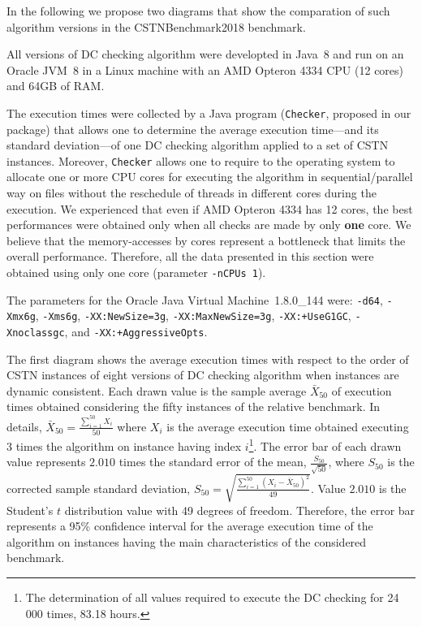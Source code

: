 \documentclass[a4paper,11pt]{article}
\begin{document}
In the following we propose two diagrams that show the comparation of such algorithm versions in the CSTNBenchmark2018 benchmark.

All versions of DC checking algorithm were developted in Java~8 and run on an Oracle JVM~8 in a Linux machine with an AMD Opteron 4334
CPU (12 cores) and 64GB of RAM.

The execution times were collected by a Java program (\texttt{Checker}, proposed in our package) that allows one to determine the average execution time---and its standard deviation---of one DC checking algorithm applied to a set of CSTN instances. Moreover,  \texttt{Checker} allows one to require to the operating system to allocate one or more
CPU cores for executing the algorithm in sequential/parallel way on files without the reschedule of threads in different cores during the execution.
We experienced that even if AMD Opteron 4334 has 12 cores, the best performances were obtained only when all checks are made by only \textbf{one} core.
We believe that the memory-accesses by cores represent a bottleneck that limits the overall performance.
Therefore, all the data presented in this section were obtained using only one core (parameter \texttt{-nCPUs 1}).

The parameters for the Oracle Java Virtual Machine~1.8.0\_144 were: \texttt{-d64}, \texttt{-Xmx6g}, \texttt{-Xms6g}, \texttt{-XX:NewSize=3g}, \texttt{-XX:MaxNewSize=3g}, \texttt{-XX:+UseG1GC}, \texttt{-Xnoclassgc}, and \texttt{-XX:+AggressiveOpts}. 

The first diagram shows the average execution times with respect to the order of CSTN instances of eight versions of DC checking algorithm when instances are dynamic consistent. 
Each drawn value is the sample average $\bar{X}_{50}$ of execution times obtained considering the fifty instances of the relative benchmark. 
In details, $\bar{X}_{50}=\frac{\sum_{i=1}^{50} X_i}{50}$ where $X_i$ is the average execution time obtained executing 3 times the algorithm on instance having index $i$\footnote{The determination of all values required to execute the DC checking for 24 000 times, 83.18 hours.}.
The error bar of each drawn value represents $2.010$ times the standard error of the mean, $\frac{S_{50}}{\sqrt{50}}$, where $S_{50}$ is the corrected sample standard deviation, $S_{50}= \sqrt{\frac{\sum_{i=1}^{50} (X_i-\bar{X}_{50})^2}{49}}$. Value $2.010$ is the Student's $t$ distribution value with 49 degrees of freedom. 
Therefore, the error bar represents a 95\% confidence interval for the average execution time of the algorithm on instances having the main characteristics of the considered benchmark.
\end{document}
